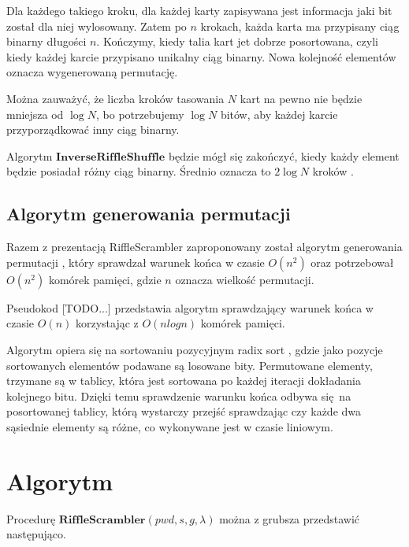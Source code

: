 Dla każdego takiego kroku, dla każdej karty zapisywana jest informacja jaki bit został dla niej wylosowany. Zatem po $n$ krokach, każda karta ma przypisany ciąg binarny długości $n$.
Kończymy, kiedy talia kart jet dobrze posortowana, czyli kiedy każdej karcie przypisano unikalny ciąg binarny. Nowa kolejność elementów oznacza wygenerowaną permutację.

Można zauważyć, że liczba kroków tasowania $N$ kart na pewno nie będzie mniejsza od $\log{N}$, bo potrzebujemy $\log{N}$ bitów, aby każdej karcie przyporządkować inny ciąg binarny.

Algorytm $\mathbf{InverseRiffleShuffle}$ będzie mógł się zakończyć, kiedy każdy element będzie posiadał różny ciąg binarny. Średnio oznacza to $2 \log{N}$ kroków \cite{rs}.

\subsection{Algorytm generowania permutacji}
Razem z prezentacją RiffleScrambler zaproponowany został algorytm generowania permutacji \cite[Algorym 1]{rs}, który sprawdzał warunek końca w czasie $O(n^2)$ oraz potrzebował $O(n^2)$ komórek pamięci, gdzie $n$ oznacza wielkość permutacji.

Pseudokod [TODO...] przedstawia algorytm sprawdzający warunek końca w czasie $O(n)$ korzystając z $O(n log{n})$ komórek pamięci.

Algorytm opiera się na sortowaniu pozycyjnym radix sort \cite{radixsort}, gdzie jako pozycje sortowanych elementów podawane są losowane bity.
Permutowane elementy, trzymane są w tablicy, która jest sortowana po każdej iteracji dokładania kolejnego bitu. Dzięki temu sprawdzenie warunku końca odbywa się na posortowanej tablicy, którą wystarczy przejść sprawdzając czy każde dwa sąsiednie elementy są różne, co wykonywane jest w czasie liniowym.

\section{Algorytm}

Procedurę $\mathbf{RiffleScrambler}(pwd, s, g,\lambda)$ można z grubsza przedstawić następująco.

